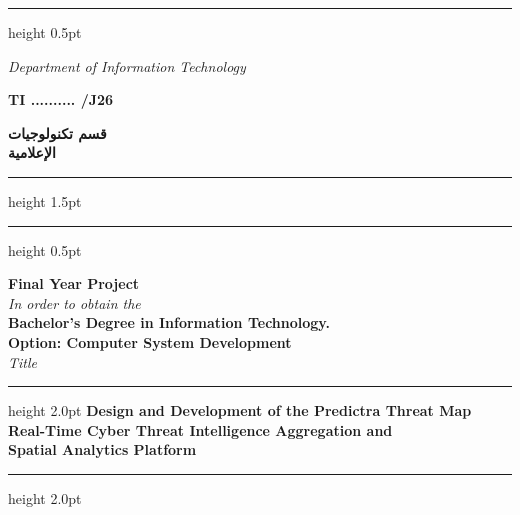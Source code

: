 \begin{titlepage}
\begin{center}
    \vspace{0.1cm}
    \hrule height 0.5pt
    \vspace{0.1cm}
    
    \noindent
    \begin{minipage}[t]{0.42\textwidth}
        \begin{flushleft}
            \fontsize{9pt}{11pt}\selectfont
            \textit{Department of Information Technology}
        \end{flushleft}
    \end{minipage}%
    \begin{minipage}[t]{0.16\textwidth}
        \begin{center}
            \fontsize{9pt}{11pt}\selectfont
            \textbf{TI .......... /J26}
        \end{center}
    \end{minipage}%
    \begin{minipage}[t]{0.42\textwidth}
        \begin{flushright}
            \fontsize{9pt}{11pt}\selectfont
            \textbf{قسم تكنولوجيات} \\
            \textbf{الإعلامية}
        \end{flushright}
    \end{minipage}
    
    \vspace{0.15cm}
    \hrule height 1.5pt
    \vspace{1.0pt}
    \hrule height 0.5pt
    
    \vspace{1.2cm}
    
    {\fontsize{18pt}{22pt}\selectfont\bfseries Final Year Project}\\[0.5cm]
    {\fontsize{12pt}{14pt}\selectfont\itshape In order to obtain the}\\[0.5cm]
    {\fontsize{14pt}{16pt}\selectfont\bfseries Bachelor's Degree in Information Technology.}\\[0.4cm]
    {\fontsize{12pt}{14pt}\selectfont\bfseries Option: Computer System Development}\\[1.0cm]
    
    {\fontsize{12pt}{14pt}\selectfont\itshape Title}\\[0.5cm]
    
    \hrule height 2.0pt
    \vspace{0.4cm}
    {\fontsize{20pt}{24pt}\selectfont\bfseries Design and Development of the Predictra Threat Map}\\[0.3cm]
    {\fontsize{11pt}{13pt}\selectfont\bfseries Real-Time Cyber Threat Intelligence Aggregation and\\ Spatial Analytics Platform}
    \vspace{0.4cm}
    \hrule height 2.0pt
    

\end{center}
\end{titlepage}
